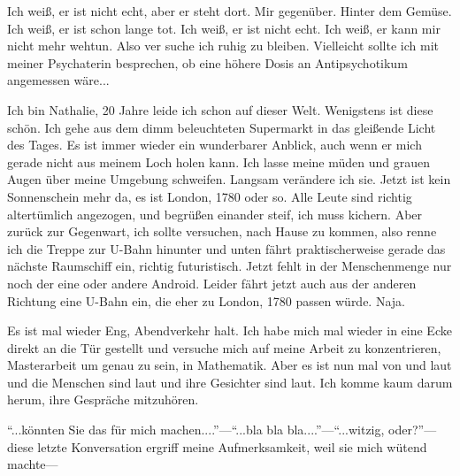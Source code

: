 \documentclass{article}
\title{\titlevar}
\author{\authorvar}
\date{\datevar}
\newcommand{\ms}{\medskip}
\begin{document}
	\maketitle

	Ich weiß, er ist nicht echt, aber er steht dort. Mir gegenüber. Hinter dem Gemüse. Ich weiß, er ist schon lange tot. Ich weiß, er ist nicht echt. Ich weiß, er kann mir nicht mehr wehtun. Also ver suche ich ruhig zu bleiben. Vielleicht sollte ich mit meiner Psychaterin besprechen, ob eine höhere Dosis an Antipsychotikum angemessen wäre...

	\ms

	Ich bin Nathalie, 20 Jahre leide ich schon auf dieser Welt. Wenigstens ist diese schön. Ich gehe aus dem dimm beleuchteten Supermarkt in das gleißende Licht des Tages. Es ist immer wieder ein wunderbarer Anblick, auch wenn er mich gerade nicht aus meinem Loch holen kann. Ich lasse meine müden und grauen Augen über meine Umgebung schweifen. Langsam verändere ich sie. Jetzt ist kein Sonnenschein mehr da, es ist London, 1780 oder so. Alle Leute sind richtig altertümlich angezogen, und begrüßen einander steif, ich muss kichern. Aber zurück zur Gegenwart, ich sollte versuchen, nach Hause zu kommen, also renne ich die Treppe zur U-Bahn hinunter und unten fährt praktischerweise gerade das nächste Raumschiff ein, richtig futuristisch. Jetzt fehlt in der Menschenmenge nur noch der eine oder andere Android. Leider fährt jetzt auch aus der anderen Richtung eine U-Bahn ein, die eher zu London, 1780 passen würde. Naja.

	\ms

	Es ist mal wieder Eng, Abendverkehr halt. Ich habe mich mal wieder in eine Ecke direkt an die Tür gestellt und versuche mich auf meine Arbeit zu konzentrieren, Masterarbeit um genau zu sein, in Mathematik. Aber es ist nun mal von und laut und die Menschen sind laut und ihre Gesichter sind laut. Ich komme kaum darum herum, ihre Gespräche mitzuhören.

	\ms

	\enquote{...könnten Sie das für mich machen....}—\enquote{...bla bla bla....}—\enquote{...witzig, oder?}—diese letzte Konversation ergriff meine Aufmerksamkeit, weil sie mich wütend machte—
\end{document}
